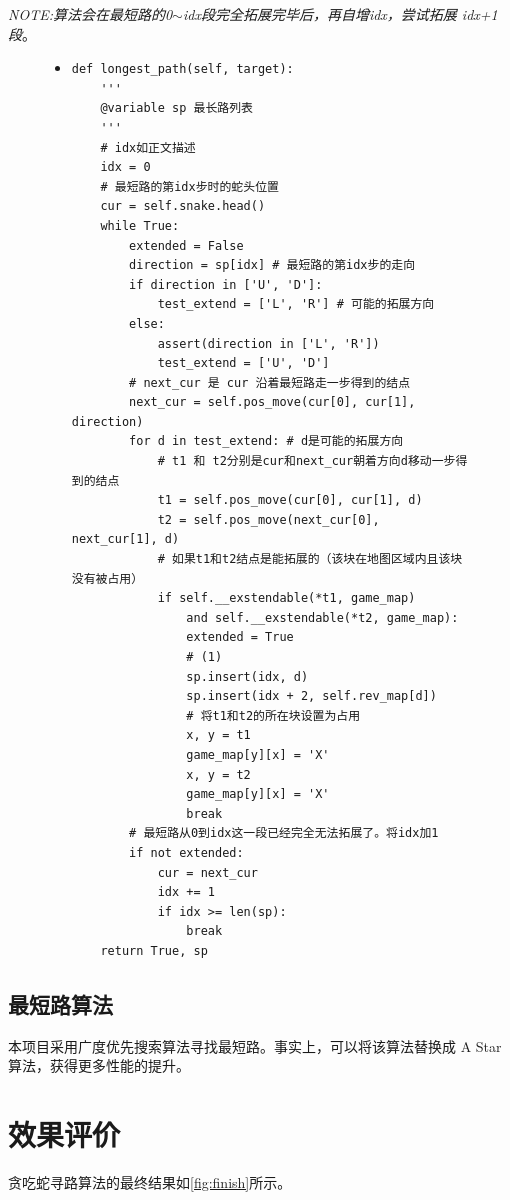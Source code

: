 \documentclass[a4paper]{article}
\begin{document}
\emph{NOTE:算法会在最短路的0$\sim$idx段完全拓展完毕后，再自增idx，尝试拓展
idx+1段}。
\begin{figure}[!hbt]
\begin{itemize}
\item[] \begin{lstlisting}[style=mypython, label=lst:longest, caption=最长路算法的实现]
def longest_path(self, target):
    '''
    @variable sp 最长路列表
    '''
    # idx如正文描述
    idx = 0
    # 最短路的第idx步时的蛇头位置
    cur = self.snake.head()
    while True:
        extended = False
        direction = sp[idx] # 最短路的第idx步的走向
        if direction in ['U', 'D']:
            test_extend = ['L', 'R'] # 可能的拓展方向
        else:
            assert(direction in ['L', 'R'])
            test_extend = ['U', 'D']
        # next_cur 是 cur 沿着最短路走一步得到的结点 
        next_cur = self.pos_move(cur[0], cur[1], direction)
        for d in test_extend: # d是可能的拓展方向
            # t1 和 t2分别是cur和next_cur朝着方向d移动一步得到的结点
            t1 = self.pos_move(cur[0], cur[1], d)
            t2 = self.pos_move(next_cur[0], next_cur[1], d)
            # 如果t1和t2结点是能拓展的（该块在地图区域内且该块没有被占用）
            if self.__exstendable(*t1, game_map) 
                and self.__exstendable(*t2, game_map):
                extended = True
                # (1)
                sp.insert(idx, d)
                sp.insert(idx + 2, self.rev_map[d])
                # 将t1和t2的所在块设置为占用
                x, y = t1
                game_map[y][x] = 'X'
                x, y = t2
                game_map[y][x] = 'X'
                break
        # 最短路从0到idx这一段已经完全无法拓展了。将idx加1
        if not extended:
            cur = next_cur
            idx += 1
            if idx >= len(sp):
                break
    return True, sp
\end{lstlisting}
\end{itemize}
\end{figure}

\subsection{最短路算法}
本项目采用广度优先搜索算法寻找最短路。事实上，可以将该算法替换成
A Star算法，获得更多性能的提升。

\section{效果评价}\label{sec:eval}
贪吃蛇寻路算法的最终结果如\autoref{fig:finish}所示。\\
\end{document}

